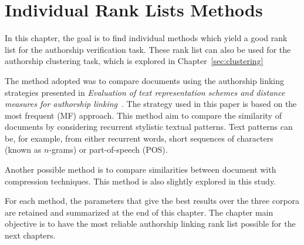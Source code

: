 \chapter{Individual Rank Lists Methods \label{sec:individual_methods}}

In this chapter, the goal is to find individual methods which yield a good rank list for the authorship verification task.
These rank list can also be used for the authorship clustering task, which is explored in Chapter~\ref{sec:clustering}

The method adopted was to compare documents using the authorship linking strategies presented in \textit{Evaluation of text representation schemes and distance measures for authorship linking}~\cite{kocher_verification}.
The strategy used in this paper is based on the most frequent (MF) approach.
This method aim to compare the similarity of documents by considering recurrent stylistic textual patterns.
Text patterns can be, for example, from either recurrent words, short sequences of characters (known as $n$-grams) or part-of-speech (POS).

Another possible method is to compare similarities between document with compression techniques.
This method is also slightly explored in this study.

For each method, the parameters that give the best results over the three corpora are retained and summarized at the end of this chapter.
The chapter main objective is to have the most reliable authorship linking rank list possible for the next chapters.







